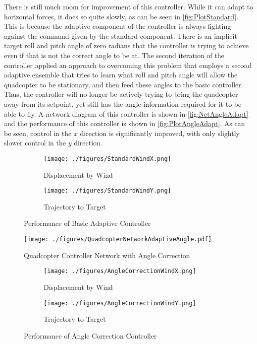 \documentclass[letterpaper,12pt,titlepage,oneside,final]{book}
\begin{document}
There is still much room for improvement of this controller. 
While it can adapt to horizontal forces, it does so quite slowly, as can be seen in \autoref{fig:PlotStandard}. 
This is because the adaptive component of the controller is always fighting against the command given by the standard component. 
There is an implicit target roll and pitch angle of zero radians that the controller is trying to achieve even if that is not the correct angle to be at. 
The second iteration of the controller applied an approach to overcoming this problem that employs a second adaptive ensemble that tries to learn what roll and pitch angle will allow the quadcopter to be stationary, and then feed these angles to the basic controller. 
Thus, the controller will no longer be actively trying to bring the quadcopter away from its setpoint, yet still has the angle information required for it to be able to fly. 
A network diagram of this controller is shown in \autoref{fig:NetAngleAdapt} and the performance of this controller is shown in \autoref{fig:PlotAngleAdapt}.
As can be seen, control in the $x$ direction is significantly improved, with only slightly slower control in the $y$ direction.

\begin{figure}
\centering
\begin{subfigure}[t]{0.48\textwidth}
\texttt{[image: ./figures/StandardWindX.png]} %
\caption{Displacement by Wind}
\end{subfigure}
\begin{subfigure}[t]{0.48\textwidth}
\texttt{[image: ./figures/StandardWindY.png]}
\caption{Trajectory to Target}
\end{subfigure}
\caption{Performance of Basic Adaptive Controller}
\label{fig:PlotStandard}
\end{figure}

\begin{figure}
\centering
\texttt{[image: ./figures/QuadcopterNetworkAdaptiveAngle.pdf]} %
\caption{Quadcopter Controller Network with Angle Correction}
\label{fig:NetAngleAdapt}
\end{figure}

\begin{figure}
\centering
\begin{subfigure}[t]{0.48\textwidth}
\texttt{[image: ./figures/AngleCorrectionWindX.png]} %
\caption{Displacement by Wind}
\label{fig:PlotAngleAdaptA}
\end{subfigure}
\begin{subfigure}[t]{0.48\textwidth}
\texttt{[image: ./figures/AngleCorrectionWindY.png]}
\caption{Trajectory to Target}
\label{fig:PlotAngleAdaptB}
\end{subfigure}
\caption{Performance of Angle Correction Controller}
\label{fig:PlotAngleAdapt}
\end{figure}
\end{document}
